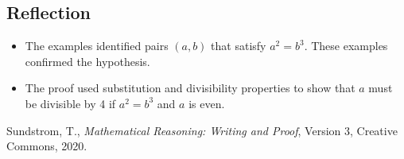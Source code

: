 \documentclass[12pt]{article}
\theoremstyle{definition}
\begin{document}
\subsection{Reflection}

\begin{itemize}
    \item The examples identified pairs \( (a, b) \) that satisfy \( a^2 = b^3 \). These examples confirmed the hypothesis.
    \item The proof used substitution and divisibility properties to show that \( a \) must be divisible by 4 if \( a^2 = b^3 \) and \( a \) is even.
\end{itemize}

\vspace{1em}
\begin{thebibliography}{9}
 Sundstrom, T., \emph{Mathematical Reasoning: Writing and Proof}, Version 3,  Creative Commons, 2020.
\end{thebibliography}
\end{document}
